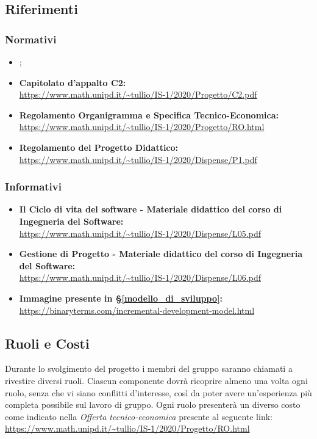 \subsection{Riferimenti}
\subsubsection{Normativi}
\begin{itemize}
    \item \textit{\NdP};
    \item \textbf{Capitolato d'appalto C2:}\\
    \url{https://www.math.unipd.it/~tullio/IS-1/2020/Progetto/C2.pdf}
    \item \textbf{Regolamento Organigramma e Specifica Tecnico-Economica:}\\
    \url{https://www.math.unipd.it/~tullio/IS-1/2020/Progetto/RO.html}
    \item \textbf{Regolamento del Progetto Didattico:}\\
    \url{https://www.math.unipd.it/~tullio/IS-1/2020/Dispense/P1.pdf}
\end{itemize}

\subsubsection{Informativi}
\begin{itemize}
    \item \textbf{Il Ciclo di vita del software - Materiale didattico del corso di Ingegneria del Software:}\\
    \url{https://www.math.unipd.it/~tullio/IS-1/2020/Dispense/L05.pdf}
    \item \textbf{Gestione di Progetto - Materiale didattico del corso di Ingegneria del Software:}\\
    \url{https://www.math.unipd.it/~tullio/IS-1/2020/Dispense/L06.pdf}
    \item \textbf{Immagine presente in \S\ref{modello_di_sviluppo}:} \\
    \url{https://binaryterms.com/incremental-development-model.html}
\end{itemize}

\subsection{Ruoli e Costi}
Durante lo svolgimento del progetto i membri del gruppo {\Gruppo} saranno chiamati a rivestire diversi ruoli. Ciascun componente dovrà ricoprire almeno una volta ogni ruolo, senza che vi siano conflitti d'interesse, così da poter avere un'esperienza più completa possibile sul lavoro di gruppo. Ogni ruolo presenterà un diverso costo come indicato nella \textit{Offerta tecnico-economica} presente al seguente link: \url{https://www.math.unipd.it/~tullio/IS-1/2020/Progetto/RO.html}

